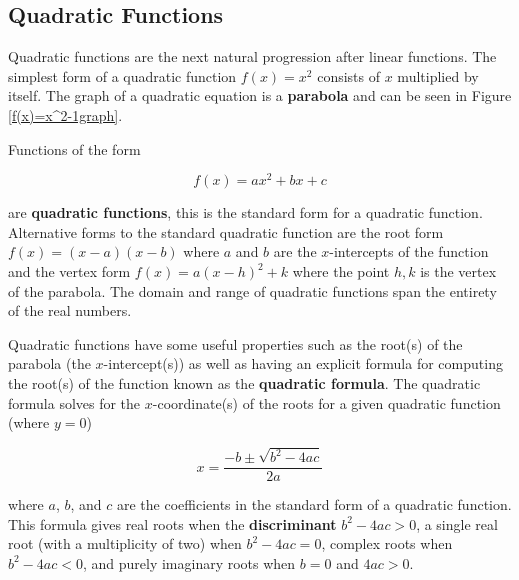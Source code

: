 
\subsection{Quadratic Functions}
Quadratic functions are the next natural progression after linear functions. The simplest form of a quadratic function $f(x) = x^2$ consists of $x$ multiplied by itself. The graph of a quadratic equation is a \textbf{parabola} and can be seen in Figure \ref{f(x)=x^2-1graph}.

\begin{definition}
    Functions of the form

    \begin{equation}
        f(x) = ax^2 + bx + c
    \end{equation}

    \noindent are \textbf{quadratic functions}, this is the standard form for a quadratic function. Alternative forms to the standard quadratic function are the root form $f(x) = (x-a)(x-b)$ where $a$ and $b$ are the $x$-intercepts of the function and the vertex form $f(x) = a(x-h)^2+k$ where the point $h,k$ is the vertex of the parabola. The domain and range of quadratic functions span the entirety of the real numbers.
\end{definition}

Quadratic functions have some useful properties such as the root(s) of the parabola (the $x$-intercept(s)) as well as having an explicit formula for computing the root(s) of the function known as the \textbf{quadratic formula}. The quadratic formula solves for the $x$-coordinate(s) of the roots for a given quadratic function (where $y=0$)

\begin{equation}
    x = \frac{-b \pm \sqrt{b^2 - 4ac}}{2a}
\end{equation}

\noindent where $a$, $b$, and $c$ are the coefficients in the standard form of a quadratic function. This formula gives real roots when the \textbf{discriminant} $b^2 - 4ac > 0$, a single real root (with a multiplicity of two) when $b^2 - 4ac = 0$, complex roots when $b^2 - 4ac < 0$, and purely imaginary roots when $b = 0$ and $4ac > 0$.

